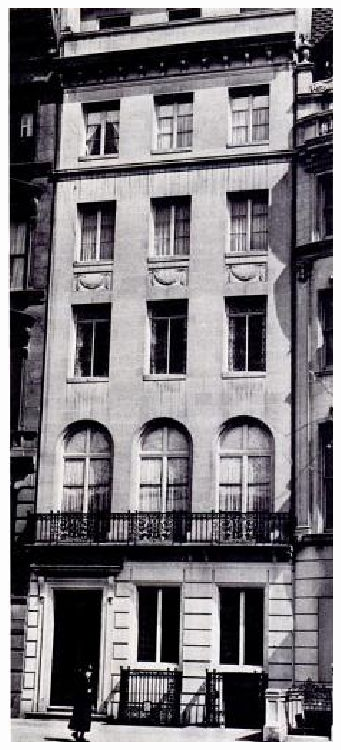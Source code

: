 {\begin{center}
{\begin{bache}
\includegraphics[width=\linewidth]{./images/bache-03.jpg}
\end{bache}}

\end{center}
}

